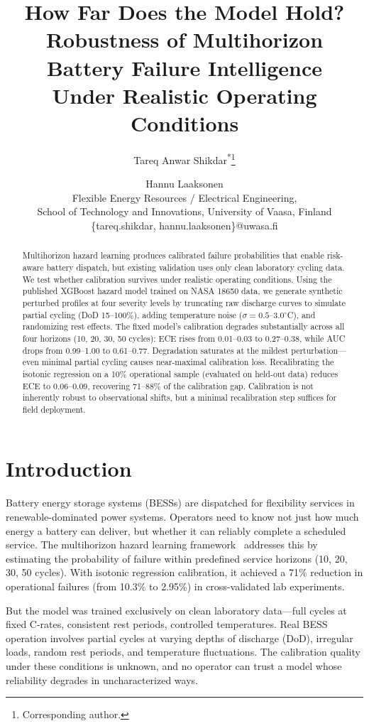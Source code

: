 \documentclass[11pt,a4paper]{article}
\title{How Far Does the Model Hold?\\
Robustness of Multihorizon Battery Failure Intelligence\\
Under Realistic Operating Conditions}
\author{Tareq Anwar Shikdar\textsuperscript{*}\thanks{Corresponding author.} \and Hannu Laaksonen\\
Flexible Energy Resources / Electrical Engineering,\\
School of Technology and Innovations, University of Vaasa, Finland\\
\{tareq.shikdar, hannu.laaksonen\}@uwasa.fi}
\begin{document}
\maketitle

\begin{abstract}
Multihorizon hazard learning produces calibrated failure probabilities that enable risk-aware battery dispatch, but existing validation uses only clean laboratory cycling data. We test whether calibration survives under realistic operating conditions. Using the published XGBoost hazard model trained on NASA 18650 data, we generate synthetic perturbed profiles at four severity levels by truncating raw discharge curves to simulate partial cycling (DoD 15--100\%), adding temperature noise ($\sigma=0.5$--$3.0^\circ$C), and randomizing rest effects. The fixed model's calibration degrades substantially across all four horizons (10, 20, 30, 50 cycles): ECE rises from 0.01--0.03 to 0.27--0.38, while AUC drops from 0.99--1.00 to 0.61--0.77. Degradation saturates at the mildest perturbation---even minimal partial cycling causes near-maximal calibration loss. Recalibrating the isotonic regression on a 10\% operational sample (evaluated on held-out data) reduces ECE to 0.06--0.09, recovering 71--88\% of the calibration gap. Calibration is not inherently robust to observational shifts, but a minimal recalibration step suffices for field deployment.
\end{abstract}

\section{Introduction}

Battery energy storage systems (BESSs) are dispatched for flexibility services in renewable-dominated power systems. Operators need to know not just how much energy a battery can deliver, but whether it can reliably complete a scheduled service. The multihorizon hazard learning framework~\cite{shikdar2026learning} addresses this by estimating the probability of failure within predefined service horizons (10, 20, 30, 50 cycles). With isotonic regression calibration, it achieved a 71\% reduction in operational failures (from 10.3\% to 2.95\%) in cross-validated lab experiments.

But the model was trained exclusively on clean laboratory data---full cycles at fixed C-rates, consistent rest periods, controlled temperatures. Real BESS operation involves partial cycles at varying depths of discharge (DoD), irregular loads, random rest periods, and temperature fluctuations. The calibration quality under these conditions is unknown, and no operator can trust a model whose reliability degrades in uncharacterized ways.
\end{document}
